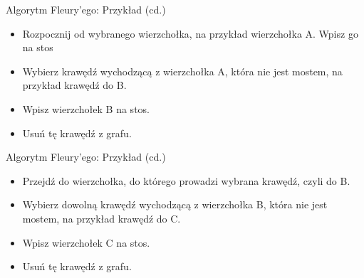 \documentclass[polish,envcountsect,10pt]{beamer}
\begin{document}
\begin{frame}{Algorytm Fleury'ego: Przykład (cd.)}
    \begin{itemize}
        \item Rozpocznij od wybranego wierzchołka, na przykład wierzchołka A. Wpisz go na stos
        \item Wybierz krawędź wychodzącą z wierzchołka A, która nie jest mostem, na przykład krawędź do B.
        \item Wpisz wierzchołek B na stos.
        \item Usuń tę krawędź z grafu.
    \end{itemize}
    \begin{center}
    \end{center}
\end{frame}
    
\begin{frame}{Algorytm Fleury'ego: Przykład (cd.)}
    \begin{itemize}
        \item Przejdź do wierzchołka, do którego prowadzi wybrana krawędź, czyli do B.
        \item Wybierz dowolną krawędź wychodzącą z wierzchołka B, która nie jest mostem, na przykład krawędź do C.
        \item Wpisz wierzchołek C na stos.
        \item Usuń tę krawędź z grafu.
    \end{itemize}
    \begin{center}
    \end{center}
\end{frame}
\end{document}
